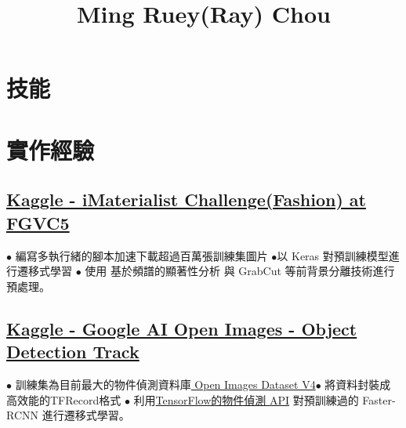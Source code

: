 \documentclass[11pt,a4paper]{moderncv}
\title{Ming Ruey(Ray) Chou}
\begin{document}
\maketitle
\vspace*{-12mm}

\section{技能}
\vspace{-0.7\baselineskip}

\section{實作經驗}

\subsection{\href{https://www.kaggle.com/c/imaterialist-challenge-fashion-2018}{\small Kaggle - iMaterialist Challenge(Fashion) at FGVC5}}
{\footnotesize{$\bullet$ 編寫多執行緒的腳本加速下載超過百萬張訓練集圖片\space\space 
$\bullet$以 Keras 對預訓練模型進行遷移式學習 \newline $\bullet$ 使用 基於頻譜的顯著性分析 與 GrabCut 等前背景分離技術進行預處理。}}

\subsection{\href{https://www.kaggle.com/c/google-ai-open-images-object-detection-track}{\small Kaggle - Google AI Open Images - Object Detection Track}}
{\footnotesize{$\bullet$ 訓練集為目前最大的物件偵測資料庫\href{https://storage.googleapis.com/openimages/web/index.html}{ Open Images Dataset V4}\space\space $\bullet$ 將資料封裝成高效能的TFRecord格式
\newline $\bullet$ 利用\href{https://github.com/tensorflow/models/tree/master/research/object_detection}{TensorFlow的物件偵測 API} 對預訓練過的 Faster-RCNN 進行遷移式學習。}}
\end{document}
